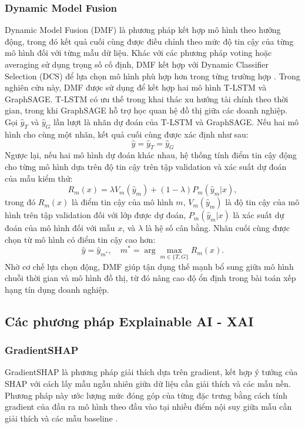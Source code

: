 \documentclass[10pt,twoside]{article}
\begin{document}
\subsubsection{Dynamic Model Fusion} Dynamic Model Fusion (DMF) là phương pháp kết hợp mô hình theo hướng động, trong đó kết quả cuối cùng được điều chỉnh theo mức độ tin cậy của từng mô hình đối với từng mẫu dữ liệu. Khác với các phương pháp voting hoặc averaging sử dụng trọng số cố định, DMF kết hợp với Dynamic Classifier Selection (DCS) để lựa chọn mô hình phù hợp hơn trong từng trường hợp \cite{toufiq_explainable_2026}. Trong nghiên cứu này, DMF được sử dụng để kết hợp hai mô hình T-LSTM và GraphSAGE. T-LSTM có ưu thế trong khai thác xu hướng tài chính theo thời gian, trong khi GraphSAGE hỗ trợ học quan hệ đồ thị giữa các doanh nghiệp. Gọi $\hat{y}_{T}$ và $\hat{y}_{G}$ lần lượt là nhãn dự đoán của T-LSTM và GraphSAGE. Nếu hai mô hình cho cùng một nhãn, kết quả cuối cùng được xác định như sau: 
\begin{equation} 
\hat{y} = \hat{y}_{T} = \hat{y}_{G} 
\end{equation} Ngược lại, nếu hai mô hình dự đoán khác nhau, hệ thống tính điểm tin cậy động cho từng mô hình dựa trên độ tin cậy trên tập validation và xác suất dự đoán của mẫu kiểm thử: 
\begin{equation} 
R_m(x) = \lambda V_m(\hat{y}_m) + (1-\lambda) P_m(\hat{y}_m|x), 
\end{equation} trong đó $R_m(x)$ là điểm tin cậy của mô hình $m$, $V_m(\hat{y}_m)$ là độ tin cậy của mô hình trên tập validation đối với lớp được dự đoán, $P_m(\hat{y}_m|x)$ là xác suất dự đoán của mô hình đối với mẫu $x$, và $\lambda$ là hệ số cân bằng. Nhãn cuối cùng được chọn từ mô hình có điểm tin cậy cao hơn: 
\begin{equation} 
\hat{y} = \hat{y}_{m^*}, \quad m^* = \arg\max_{m \in \{T,G\}} R_m(x). 
\end{equation} Nhờ cơ chế lựa chọn động, DMF giúp tận dụng thế mạnh bổ sung giữa mô hình chuỗi thời gian và mô hình đồ thị, từ đó nâng cao độ ổn định trong bài toán xếp hạng tín dụng doanh nghiệp.
\subsection{Các phương pháp Explainable AI - XAI}
\subsubsection{GradientSHAP} 
GradientSHAP là phương pháp giải thích dựa trên gradient, kết hợp ý tưởng của SHAP với cách lấy mẫu ngẫu nhiên giữa dữ liệu cần giải thích và các mẫu nền. Phương pháp này ước lượng mức đóng góp của từng đặc trưng bằng cách tính gradient của đầu ra mô hình theo đầu vào tại nhiều điểm nội suy giữa mẫu cần giải thích và các mẫu baseline \cite{lundberg_unified_2017, kokhlikyan_captum_2020}. 
\end{document}
